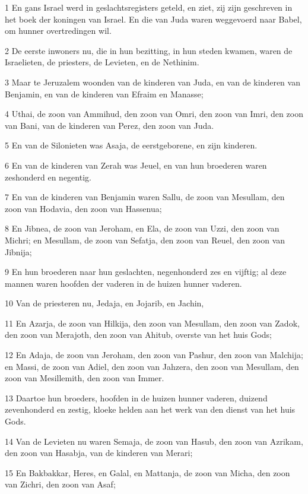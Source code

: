 \par 1 En gans Israel werd in geslachtsregisters geteld, en ziet, zij zijn geschreven in het boek der koningen van Israel. En die van Juda waren weggevoerd naar Babel, om hunner overtredingen wil.
\par 2 De eerste inwoners nu, die in hun bezitting, in hun steden kwamen, waren de Israelieten, de priesters, de Levieten, en de Nethinim.
\par 3 Maar te Jeruzalem woonden van de kinderen van Juda, en van de kinderen van Benjamin, en van de kinderen van Efraim en Manasse;
\par 4 Uthai, de zoon van Ammihud, den zoon van Omri, den zoon van Imri, den zoon van Bani, van de kinderen van Perez, den zoon van Juda.
\par 5 En van de Silonieten was Asaja, de eerstgeborene, en zijn kinderen.
\par 6 En van de kinderen van Zerah was Jeuel, en van hun broederen waren zeshonderd en negentig.
\par 7 En van de kinderen van Benjamin waren Sallu, de zoon van Mesullam, den zoon van Hodavia, den zoon van Hassenua;
\par 8 En Jibnea, de zoon van Jeroham, en Ela, de zoon van Uzzi, den zoon van Michri; en Mesullam, de zoon van Sefatja, den zoon van Reuel, den zoon van Jibnija;
\par 9 En hun broederen naar hun geslachten, negenhonderd zes en vijftig; al deze mannen waren hoofden der vaderen in de huizen hunner vaderen.
\par 10 Van de priesteren nu, Jedaja, en Jojarib, en Jachin,
\par 11 En Azarja, de zoon van Hilkija, den zoon van Mesullam, den zoon van Zadok, den zoon van Merajoth, den zoon van Ahitub, overste van het huis Gods;
\par 12 En Adaja, de zoon van Jeroham, den zoon van Pashur, den zoon van Malchija; en Massi, de zoon van Adiel, den zoon van Jahzera, den zoon van Mesullam, den zoon van Mesillemith, den zoon van Immer.
\par 13 Daartoe hun broeders, hoofden in de huizen hunner vaderen, duizend zevenhonderd en zestig, kloeke helden aan het werk van den dienst van het huis Gods.
\par 14 Van de Levieten nu waren Semaja, de zoon van Hasub, den zoon van Azrikam, den zoon van Hasabja, van de kinderen van Merari;
\par 15 En Bakbakkar, Heres, en Galal, en Mattanja, de zoon van Micha, den zoon van Zichri, den zoon van Asaf;
